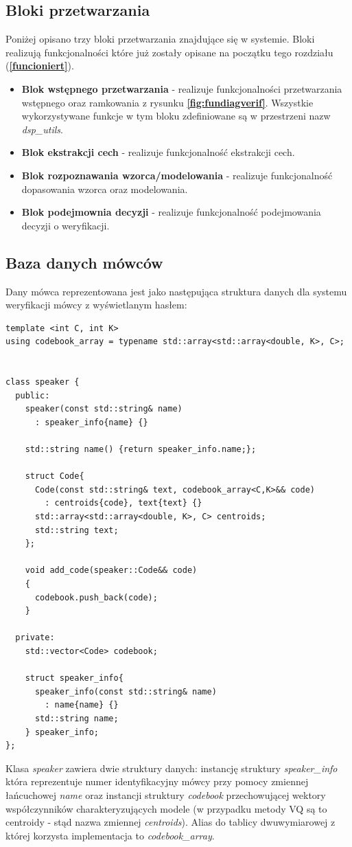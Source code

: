 \subsection{Bloki przetwarzania}
Poniżej opisano trzy bloki przetwarzania znajdujące się w systemie. Bloki realizują funkcjonalności które już zostały opisane na początku tego rozdziału (\textbf{\ref{funcioniert}}).
\begin{itemize}
\item{\textbf{Blok wstępnego przetwarzania}} - realizuje funkcjonalności przetwarzania wstępnego oraz ramkowania z rysunku \textbf{\ref{fig:fundiagverif}}. Wszystkie wykorzystywane funkcje w tym bloku zdefiniowane są w przestrzeni nazw \textit{dsp\_utils}. 
\item{\textbf{Blok ekstrakcji cech\label{archfeatureextraction}}} - realizuje funkcjonalność ekstrakcji cech. 
\item{\textbf{Blok rozpoznawania wzorca/modelowania\label{archpatternmatching}}} - realizuje funkcjonalność dopasowania wzorca oraz modelowania.
\item{\textbf{Blok podejmownia decyzji}} - realizuje funkcjonalność podejmowania decyzji o weryfikacji.
\end{itemize}


\subsection{Baza danych mówców}
Dany mówca reprezentowana jest jako następująca struktura danych dla systemu weryfikacji mówcy z wyświetlanym hasłem:
\begin{lstlisting}[style=lst:cpp, caption=struktura danych przechowująca informację o mówcy\label{lst:database}]
template <int C, int K>
using codebook_array = typename std::array<std::array<double, K>, C>; 


class speaker {
  public:
    speaker(const std::string& name)
      : speaker_info{name} {}  

    std::string name() {return speaker_info.name;};

    struct Code{
      Code(const std::string& text, codebook_array<C,K>&& code)
        : centroids{code}, text{text} {}
      std::array<std::array<double, K>, C> centroids;
      std::string text;
    };

    void add_code(speaker::Code&& code)
    {
      codebook.push_back(code); 
    }

  private:
    std::vector<Code> codebook;

    struct speaker_info{
      speaker_info(const std::string& name)
        : name{name} {}
      std::string name;
    } speaker_info;
};
\end{lstlisting}

Klasa \textit{speaker} zawiera dwie struktury danych: instancję struktury \textit{speaker\_info} która reprezentuje numer identyfikacyjny mówcy przy pomocy zmiennej łańcuchowej \textit{name} oraz instancji struktury \textit{codebook} przechowującej wektory współczynników charakteryzujących modele (w przypadku metody VQ są to centroidy - stąd nazwa zmiennej \textit{centroids}). Alias do tablicy dwuwymiarowej z której korzysta implementacja to \textit{codebook\_array}.
